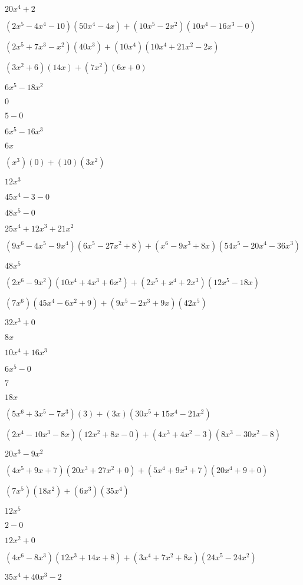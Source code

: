 \documentclass{article}
\begin{document}
\begin{multicols}{2}
$20x^{4}+2$\item $(2x^{5}-4x^{4}-10)(50x^{4}-4x)+(10x^{5}-2x^2)(10x^{4}-16x^{3}-0)$\item $(2x^{5}+7x^{3}-x^2)(40x^{3})+(10x^{4})(10x^{4}+21x^{2}-2x)$\item $(3x^2+6)(14x)+(7x^2)(6x+0)$\item $6x^{5}-18x^{2}$\item $0$\item $5-0$\item $6x^{5}-16x^{3}$\item $6x$\item $(x^{3})(0)+(10)(3x^{2})$\item $12x^{3}$\item $45x^{4}-3-0$\item $48x^{5}-0$\item $25x^{4}+12x^{3}+21x^{2}$\item $(9x^{6}-4x^{5}-9x^{4})(6x^{5}-27x^{2}+8)+(x^{6}-9x^{3}+8x)(54x^{5}-20x^{4}-36x^{3})$\item $48x^{5}$\item $(2x^{6}-9x^2)(10x^{4}+4x^{3}+6x^{2})+(2x^{5}+x^{4}+2x^{3})(12x^{5}-18x)$\item $(7x^{6})(45x^{4}-6x^{2}+9)+(9x^{5}-2x^{3}+9x)(42x^{5})$\item $32x^{3}+0$\item $8x$\item $10x^{4}+16x^{3}$\item $6x^{5}-0$\item $7$\item $18x$\item $(5x^{6}+3x^{5}-7x^{3})(3)+(3x)(30x^{5}+15x^{4}-21x^{2})$\item $(2x^{4}-10x^{3}-8x)(12x^{2}+8x-0)+(4x^{3}+4x^2-3)(8x^{3}-30x^{2}-8)$\item $20x^{3}-9x^{2}$\item $(4x^{5}+9x+7)(20x^{3}+27x^{2}+0)+(5x^{4}+9x^{3}+7)(20x^{4}+9+0)$\item $(7x^{5})(18x^{2})+(6x^{3})(35x^{4})$\item $12x^{5}$\item $2-0$\item $12x^{2}+0$\item $(4x^{6}-8x^{3})(12x^{3}+14x+8)+(3x^{4}+7x^2+8x)(24x^{5}-24x^{2})$\item $35x^{4}+40x^{3}-2$\item 
\end{multicols}
\end{document}

